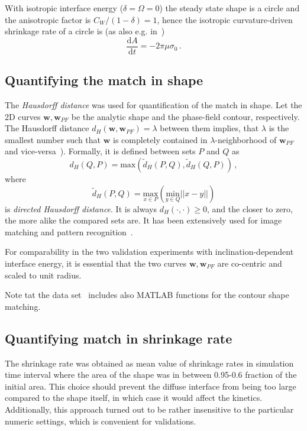 With isotropic interface energy ($\delta=\Omega=0$) the steady state shape is a circle and the anisotropic factor is $C_W/(1-\delta)=1$, hence the isotropic curvature-driven shrinkage rate of a circle is (as also e.g. in~\cite{Moelans2009})
\begin{equation} \label{eq_iso_shrrate}
	\frac{\mathrm{d}A}{\mathrm{d}t} = -2\pi\mu\sigma_0 \,.
\end{equation}

\subsection{Quantifying the match in shape}
The \textit{Hausdorff distance} was used for quantification of the match in shape. Let the 2D curves $\bm{w},\bm{w}_{PF}$ be the analytic shape and the phase-field contour, respectively. The Hausdorff distance $d_H(\bm{w},\bm{w}_{PF})=\lambda$ between them implies, that $\lambda$ is the smallest number such that $ \bm{w} $ is completely contained in $\lambda$-neighborhood of $\bm{w}_{PF}$ and vice-versa~\cite{Alt2004}). Formally, it is defined between sets $P$ and $Q$ as 
\begin{equation}
	d_H(Q,P)=\mathrm{max}(\tilde{d}_H(P,Q),\tilde{d}_H(Q,P)) \,,
\end{equation}
where 
\begin{equation}
	\tilde{d}_H(P,Q)=\underset{x\in P}{\mathrm{max}}( \underset{y\in Q}{\mathrm{min}}||x-y|| )
\end{equation}
is \textit{directed Hausdorff distance}. It is always $d_H(\cdot,\cdot)\geq 0$, and the closer to zero, the more alike the compared sets are. It has been extensively used for image matching and pattern recognition~\cite{LiZhu2014}. 

For comparability in the two validation experiments with inclination-dependent interface energy, it is essential that the two curves $\bm{w},\bm{w}_{PF}$ are co-centric and scaled to unit radius.

Note tat the data set~\cite{Minar2022dataset} includes also MATLAB functions for the contour shape matching.

\subsection{Quantifying match in shrinkage rate}
The shrinkage rate was obtained as mean value of shrinkage rates in simulation time interval where the area of the shape was in between 0.95-0.6 fraction of the initial area. This choice should prevent the diffuse interface from being too large compared to the shape itself, in which case it would affect the kinetics. Additionally, this approach turned out to be rather insensitive to the particular numeric settings, which is convenient for validations. 

